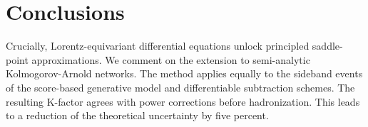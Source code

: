 \section{Conclusions}\label{sec:conclusions}

Crucially, Lorentz-equivariant differential equations unlock principled
saddle-point approximations. We comment on the extension to
semi-analytic Kolmogorov-Arnold networks. The method applies equally to
the sideband events of the score-based generative model and
differentiable subtraction schemes. The resulting K-factor agrees with
power corrections before hadronization. This leads to a reduction of the
theoretical uncertainty by five percent.


